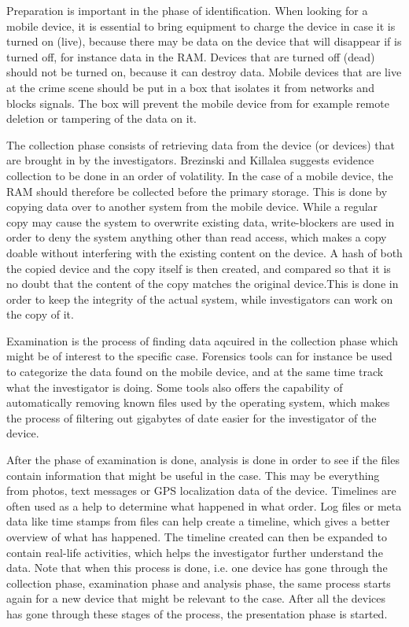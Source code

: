 Preparation is important in the phase of identification. When looking for a mobile device, it is essential to bring equipment to charge the device in case it is turned on (live), because there may be data on the device that will disappear if is turned off, for instance data in the RAM. Devices that are turned off (dead) should not be turned on, because it can destroy data. Mobile devices that are live at the crime scene should be put in a box that isolates it from networks and blocks signals. The box will prevent the mobile device from for example remote deletion or tampering of the data on it\cite{DiFoBook}. 

The collection phase consists of retrieving data from the device (or devices) that are brought in by the investigators\cite{DiFoBook}. Brezinski and Killalea\cite{RFC3227} suggests evidence collection to be done in an order of volatility. In the case of a mobile device, the RAM should therefore be collected before the primary storage. This is done by copying data over to another system from the mobile device. While a regular copy may cause the system to overwrite existing data, write-blockers are used in order to deny the system anything other than read access, which makes a copy doable without interfering with the existing content on the device. A hash of both the copied device and the copy itself is then created, and compared so that it is no doubt that the content of the copy matches the original device\cite{DiFoBook}.This is done in order to keep the integrity of the actual system, while investigators can work on the copy of it. 

Examination is the process of finding data aqcuired in the collection phase which might be of interest to the specific case. Forensics tools can for instance be used to categorize the data found on the mobile device, and at the same time track what the investigator is doing. Some tools also offers the capability of automatically removing known files used by the operating system, which makes the process of filtering out gigabytes of date easier for the investigator of the device.

After the phase of examination is done, analysis is done in order to see if the files contain information that might be useful in the case. This may be everything from photos, text messages or GPS localization data of the device. Timelines are often used as a help to determine what happened in what order. Log files or meta data like time stamps from files can help create a timeline, which gives a better overview of what has happened. The timeline created can then be expanded to contain real-life activities, which helps the investigator further understand the data. Note that when this process is done, i.e. one device has gone through the collection phase, examination phase and analysis phase, the same process starts again for a new device that might be relevant to the case. After all the devices has gone through these stages of the process, the presentation phase is started.
